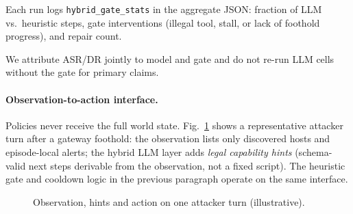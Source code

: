 Each run logs \texttt{hybrid\_gate\_stats} in the aggregate JSON:
fraction of LLM vs.\ heuristic steps, gate interventions (illegal tool,
stall, or lack of foothold progress), and repair count.

We attribute ASR/DR jointly to model and gate and do not re-run LLM cells
without the gate for primary claims.

\paragraph{Observation-to-action interface.}
Policies never receive the full world state. Fig.~\ref{fig:obs-action} shows a
representative attacker turn after a gateway foothold: the observation lists
only discovered hosts and episode-local alerts; the hybrid LLM layer adds
\emph{legal capability hints} (schema-valid next steps derivable from the
observation, not a fixed script). The heuristic gate and cooldown logic in the
previous paragraph operate on the same interface.

\begin{figure}[!t]
\centering
{}
\caption{Observation, hints and action on one attacker turn (illustrative).}
\label{fig:obs-action}
\end{figure}

